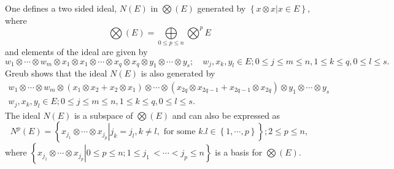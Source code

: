 \documentclass[aps,preprint]{revtex4}%
\begin{document}
One defines a two sided ideal, $N\left(  E\right)  $ in $%
{\textstyle\bigotimes}
\left(  E\right)  $ generated by $\left\{  \left.  x\otimes x\right\vert x\in
E\right\}  ,$ where
\begin{equation}%
{\textstyle\bigotimes}
\left(  E\right)  =%
{\textstyle\bigoplus\limits_{0\leq p\leq n}}
{\textstyle\bigotimes\nolimits^{p}}
E
\end{equation}
and elements of the ideal are given by
\begin{equation}
w_{1}\otimes\cdots\otimes w_{m}\otimes x_{1}\otimes x_{1}\otimes\cdots\otimes
x_{q}\otimes x_{q}\otimes y_{1}\otimes\cdots\otimes y_{s};\quad w_{j}%
,x_{k},y_{l}\in E;0\leq j\leq m\leq n,1\leq k\leq q,0\leq l\leq s.
\end{equation}
Greub shows that the ideal $N\left(  E\right)  $ is also generated by
\begin{gather}
w_{1}\otimes\cdots\otimes w_{m}\otimes\left(  x_{1}\otimes x_{2}+x_{2}\otimes
x_{1}\right)  \otimes\cdots\otimes\left(  x_{2q}\otimes x_{2q-1}%
+x_{2q-1}\otimes x_{2q}\right)  \otimes y_{1}\otimes\cdots\otimes y_{s}\\
w_{j},x_{k},y_{l}\in E;0\leq j\leq m\leq n,1\leq k\leq q,0\leq l\leq s.
\end{gather}
The ideal $N\left(  E\right)  $ is a subspace of $%
{\textstyle\bigotimes}
\left(  E\right)  $ and can also be expressed as
\begin{equation}
N^{p}\left(  E\right)  =\left\{  \left.  x_{j_{1}}\otimes\cdots\otimes
x_{j_{p}}\right\vert j_{k}=j_{l},k\neq l,\text{ for some }k.l\in\left\{
1,\cdots,p\right\}  \right\}  ;2\leq p\leq n,
\end{equation}
where $\left\{  \left.  x_{j_{1}}\otimes\cdots\otimes x_{j_{p}}\right\vert
0\leq p\leq n;1\leq j_{1}\,<\cdots<j_{p}\leq n\right\}  $ is a basis for $%
{\textstyle\bigotimes}
\left(  E\right)  .$
\end{document}
